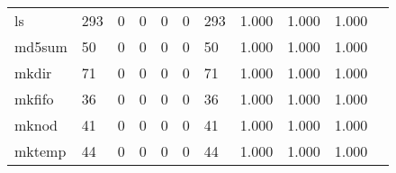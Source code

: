\begin{longtable}{lp{1.2cm}p{1.2cm}p{1.2cm}p{1.2cm}p{1.2cm}p{1.2cm}p{1.2cm}p{1.2cm}p{1.2cm}p{1.2cm}}
ls        &                                   293 &                                                  0 &                                                  0 &                                                  0 &                                                  0 &                                                293 &                                              1.000 &                                              1.000 &                                              1.000 \\
md5sum    &                                    50 &                                                  0 &                                                  0 &                                                  0 &                                                  0 &                                                 50 &                                              1.000 &                                              1.000 &                                              1.000 \\
mkdir     &                                    71 &                                                  0 &                                                  0 &                                                  0 &                                                  0 &                                                 71 &                                              1.000 &                                              1.000 &                                              1.000 \\
mkfifo    &                                    36 &                                                  0 &                                                  0 &                                                  0 &                                                  0 &                                                 36 &                                              1.000 &                                              1.000 &                                              1.000 \\
mknod     &                                    41 &                                                  0 &                                                  0 &                                                  0 &                                                  0 &                                                 41 &                                              1.000 &                                              1.000 &                                              1.000 \\
mktemp    &                                    44 &                                                  0 &                                                  0 &                                                  0 &                                                  0 &                                                 44 &                                              1.000 &                                              1.000 &                                              1.000 \\

\end{longtable}
